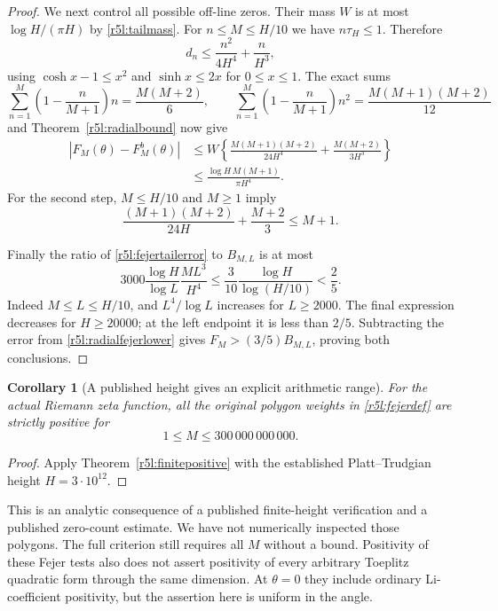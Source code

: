 \documentclass[11pt,a4paper]{article}
\newtheorem{corollary}[theorem]{Corollary}
\theoremstyle{definition}\newtheorem{definition}[theorem]{Definition}
\theoremstyle{remark}\newtheorem{remark}[theorem]{Remark}
\numberwithin{equation}{section}
\begin{document}
\begin{proof}
We next control all possible off-line zeros.  Their mass $W$ is at
most $\log H/(\pi H)$ by \eqref{r5l:tailmass}.  For
$n\le M\le H/10$ we have $n\tau_H\le1$.  Therefore
\[
 d_n\le\frac{n^2}{4H^4}+\frac n{H^3},
\]
using $\cosh x-1\le x^2$ and $\sinh x\le2x$ for $0\le x\le1$.
The exact sums
\[
 \sum_{n=1}^M\left(1-\frac n{M+1}\right)n
       =\frac{M(M+2)}6,
 \qquad
 \sum_{n=1}^M\left(1-\frac n{M+1}\right)n^2
       =\frac{M(M+1)(M+2)}{12}
\]
and Theorem~\ref{r5l:radialbound} now give
\begin{align}
 |F_M(\theta)-F_M^b(\theta)|
 &\le W\left\{
 \frac{M(M+1)(M+2)}{24H^4}
       +\frac{M(M+2)}{3H^3}\right\}\nonumber\\
 &\le\frac{\log H\,M(M+1)}{\pi H^4}.
       \label{r5l:fejertailerror}
\end{align}
For the second step, $M\le H/10$ and $M\ge1$ imply
\[
 \frac{(M+1)(M+2)}{24H}+\frac{M+2}{3}\le M+1.
\]

Finally the ratio of \eqref{r5l:fejertailerror} to
$B_{M,L}$ is at most
\begin{equation}\label{r5l:marginratio}
 3000\frac{\log H}{\log L}\frac{ML^3}{H^4}
 \le\frac3{10}\frac{\log H}{\log(H/10)}<\frac25.
\end{equation}
Indeed $M\le L\le H/10$, and $L^4/\log L$ increases for
$L\ge2000$.  The final expression decreases for $H\ge20000$;
at the left endpoint it is less than $2/5$.  Subtracting the
error from \eqref{r5l:radialfejerlower} gives
$F_M>(3/5)B_{M,L}$, proving both conclusions.
\end{proof}

\begin{corollary}[A published height gives an explicit arithmetic range]
\label{r5l:numericrange}
For the actual Riemann zeta function, all the original polygon
weights in \eqref{r5l:fejerdef} are strictly positive for
\[
 1\le M\le300\,000\,000\,000.
\]
\end{corollary}
\begin{proof}
Apply Theorem~\ref{r5l:finitepositive} with the established
Platt--Trudgian height $H=3\cdot10^{12}$.
\end{proof}

This is an analytic consequence of a published finite-height
verification and a published zero-count estimate.  We have not
numerically inspected those polygons.  The full criterion still
requires all $M$ without a bound.  Positivity of these Fejer tests
also does not assert positivity of every arbitrary Toeplitz
quadratic form through the same dimension.  At $\theta=0$ they
include ordinary Li-coefficient positivity, but the assertion here
is uniform in the angle.
\end{document}
